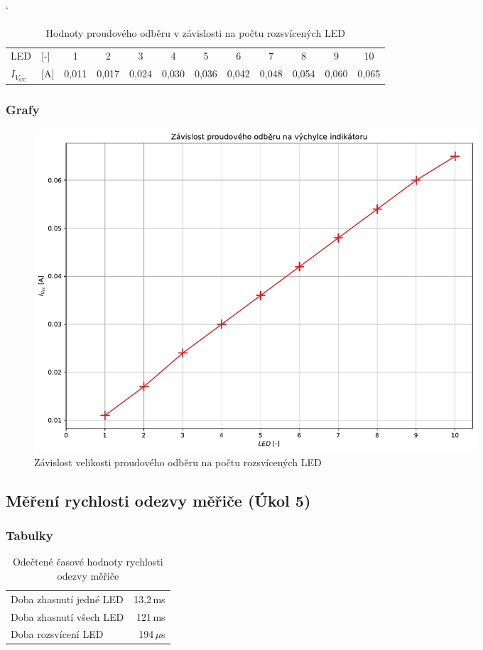 \documentclass[a4paper, czech]{article}
\begin{document}
\begin{table}[H]
    \catcode`
    \centering
    \caption{Hodnoty proudového odběru v závislosti na počtu rozsvícených LED}
    \begin{tabular}{ll|cccccccccc}
        \toprule
        LED & [-]              & 1     & 2     & 3     & 4     & 5     & 6     & 7     & 8     & 9     & 10    \\
        \cmidrule(rl){1-12}
        $I_{V_{\text{CC}}}$ & {[}A{]} & 0,011 & 0,017 & 0,024 & 0,030 & 0,036 & 0,042 & 0,048 & 0,054 & 0,060 & 0,065 \\
        \bottomrule
    \end{tabular}
\end{table}

\subsubsection{Grafy}

\begin{figure}[H]
    \centering
    \includegraphics[width=0.8\textwidth]{grafy/graf3.pdf}
    \caption{Závislost velikosti proudového odběru na počtu rozsvícených LED}
\end{figure}

\subsection{Měření rychlosti odezvy měřiče (Úkol 5)}

\subsubsection{Tabulky}

\begin{table}[H]
    \centering
    \caption{Odečtené časové hodnoty rychlosti odezvy měřiče}
    \begin{tabular}{lr}
        \toprule
        Doba zhasnutí jedné LED & 13,2\,ms \\
        Doba zhasnutí všech LED & 121\,ms \\
        Doba rozsvícení LED & 194\,$\mu$s \\
        \bottomrule
    \end{tabular}
\end{table}
\end{document}
